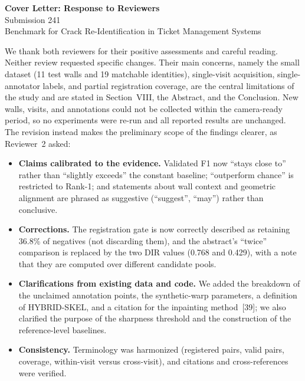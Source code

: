 \documentclass[11pt,a4paper]{article}
\begin{document}
\begin{center}
{\Large\bfseries Cover Letter: Response to Reviewers}\\[0.6em]
{\large Submission 241}\\[0.3em]
{\large Benchmark for Crack Re-Identification in Ticket Management Systems}
\end{center}

\vspace{0.3em}

We thank both reviewers for their positive assessments and careful reading.
Neither review requested specific changes. Their main concerns, namely the small
dataset (11 test walls and 19 matchable identities), single-visit acquisition,
single-annotator labels, and partial registration coverage, are the central
limitations of the study and are stated in Section~VIII, the Abstract, and the
Conclusion. New walls, visits, and annotations could not be collected within the
camera-ready period, so no experiments were re-run and all reported results are
unchanged. The revision instead makes the preliminary scope of the findings
clearer, as Reviewer~2 asked:

\begin{itemize}
  \item \textbf{Claims calibrated to the evidence.} Validated F1 now ``stays
  close to'' rather than ``slightly exceeds'' the constant baseline; ``outperform
  chance'' is restricted to Rank-1; and statements about wall context and
  geometric alignment are phrased as suggestive (``suggest'', ``may'') rather
  than conclusive.
  \item \textbf{Corrections.} The registration gate is now correctly described
  as retaining 36.8\% of negatives (not discarding them), and the abstract's
  ``twice'' comparison is replaced by the two DIR values (0.768 and 0.429), with
  a note that they are computed over different candidate pools.
  \item \textbf{Clarifications from existing data and code.} We added the
  breakdown of the unclaimed annotation points, the synthetic-warp parameters, a
  definition of HYBRID-SKEL, and a citation for the inpainting method~[39]; we
  also clarified the purpose of the sharpness threshold and the construction of
  the reference-level baselines.
  \item \textbf{Consistency.} Terminology was harmonized (registered pairs, valid
  pairs, coverage, within-visit versus cross-visit), and citations and
  cross-references were verified.
\end{itemize}
\end{document}
